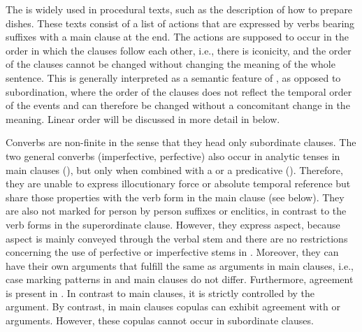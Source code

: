The  is widely used in procedural texts, such as the description of how to prepare dishes. These texts consist of a list of actions that are expressed by verbs bearing  suffixes with a main clause at the end. The actions are supposed to occur in the order in which the clauses follow each other, i.e., there is iconicity, and the order of the clauses cannot be changed without changing the meaning of the whole sentence. This is generally interpreted as a semantic feature of , as opposed to subordination, where the order of the clauses does not reflect the temporal order of the events and can therefore be changed without a concomitant change in the meaning. Linear order will be discussed in more detail in  below.

Converbs are non-finite in the sense that they head only subordinate clauses. The two general converbs (imperfective, perfective) also occur in analytic tenses in main clauses (), but only when combined with a  or a predicative  (). Therefore, they are unable to express illocutionary force or absolute temporal reference but share those properties with the verb form in the main clause (see  below). They are also not marked for person by person suffixes or enclitics, in contrast to the verb forms in the superordinate clause. However, they express aspect, because aspect is mainly conveyed through the verbal stem and there are no restrictions concerning the use of perfective or imperfective stems in . Moreover, they can have their own arguments that fulfill the same  as arguments in main clauses, i.e., case marking patterns in  and main clauses do not differ. Furthermore,  agreement is present in . In contrast to main clauses, it is strictly controlled by the  argument. By contrast, in main clauses copulas can exhibit  agreement with  or  arguments. However, these copulas cannot occur in subordinate clauses.

